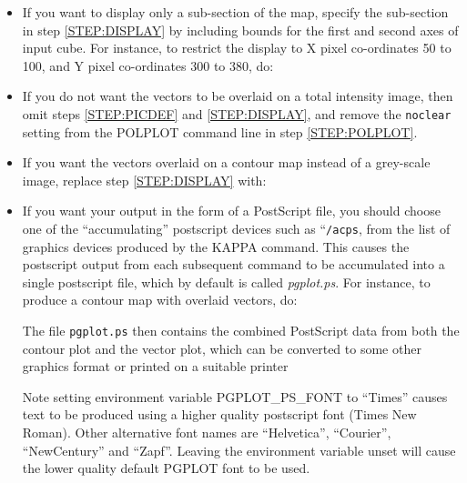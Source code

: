 \documentclass[twoside,11pt]{starlink}
\begin{document}
\begin{itemize}

\item If you want to display only a sub-section of the map, specify the
sub-section in step \ref{STEP:DISPLAY} by including bounds for the
first and second axes of input cube. For instance, to restrict the
display to X pixel co-ordinates 50 to 100, and Y pixel co-ordinates 300
to 380, do:

\begin{terminalv}
\end{terminalv}

\item If you do not want the vectors to be overlaid on a total
intensity image, then omit steps \ref{STEP:PICDEF} and
\ref{STEP:DISPLAY}, and remove the \verb+noclear+ setting from the
POLPLOT command line in step \ref{STEP:POLPLOT}.

\item If you want the vectors overlaid on a contour map instead of a
grey-scale image, replace step \ref{STEP:DISPLAY} with:

\begin{terminalv}
\end{terminalv}

\item If you want your output in the form of a PostScript file, you
should choose one of the ``accumulating'' postscript devices such as
``\texttt{/acps}, from the list of graphics devices produced by the KAPPA
 command. This causes the postscript output
from each subsequent command to be accumulated into a single postscript
file, which by default is called \emph{pgplot.ps}. For instance, to produce
a contour map with overlaid vectors, do:

\begin{terminalv}
\end{terminalv}

The file \verb+pgplot.ps+ then contains the combined PostScript data
from both the contour plot and the vector plot, which can be converted
to some other graphics format or printed on a suitable printer

Note setting environment variable PGPLOT\_PS\_FONT to ``Times'' causes
text to be produced using a higher quality postscript font (Times New
Roman). Other alternative font names are ``Helvetica'', ``Courier'',
``NewCentury'' and ``Zapf''. Leaving the environment variable unset will
cause the lower quality default PGPLOT font to be used.

\end{itemize}
\end{document}
